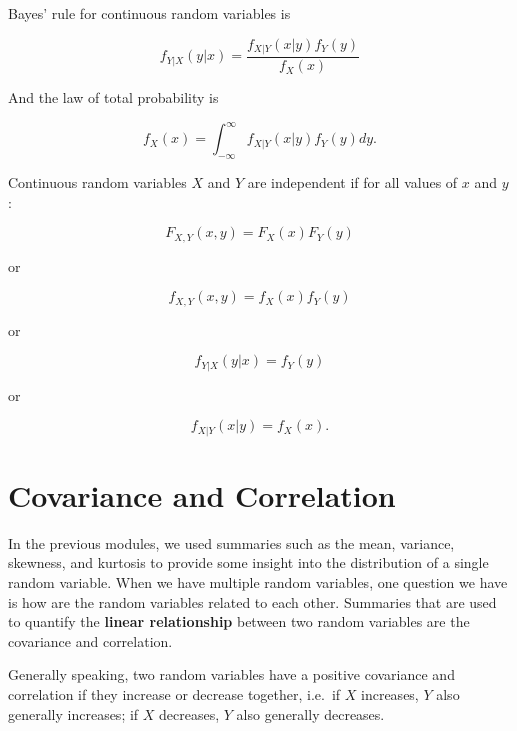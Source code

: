 \documentclass[
]{book}
\begin{document}
Bayes' rule for continuous random variables is

\begin{equation} 
f_{Y|X}(y|x) = \frac{f_{X|Y}(x|y) f_Y(y)}{f_X(x)}
\label{eq:5-condPDFbayes}
\end{equation}

And the law of total probability is

\begin{equation} 
f_X(x) = \int_{-\infty}^\infty f_{X|Y}(x|y) f_Y(y) dy.
\label{eq:5-condPDFtotal}
\end{equation}

Continuous random variables \(X\) and \(Y\) are independent if for all values of \(x\) and \(y\):

\begin{equation} 
F_{X,Y} (x,y) = F_X(x) F_Y(y)
\label{eq:5-indcont1}
\end{equation}

or

\begin{equation} 
f_{X,Y} (x,y) = f_X(x) f_Y(y)
\label{eq:5-indcont2}
\end{equation}

or

\begin{equation} 
f_{Y|X} (y|x) = f_Y(y)
\label{eq:5-indcont3}
\end{equation}

or

\begin{equation} 
f_{X|Y} (x|y) = f_X(x).
\label{eq:5-indcont4}
\end{equation}

\section{Covariance and Correlation}\label{covariance-and-correlation}

In the previous modules, we used summaries such as the mean, variance, skewness, and kurtosis to provide some insight into the distribution of a single random variable. When we have multiple random variables, one question we have is how are the random variables related to each other. Summaries that are used to quantify the \textbf{linear relationship} between two random variables are the covariance and correlation.

Generally speaking, two random variables have a positive covariance and correlation if they increase or decrease together, i.e.~if \(X\) increases, \(Y\) also generally increases; if \(X\) decreases, \(Y\) also generally decreases.
\end{document}
